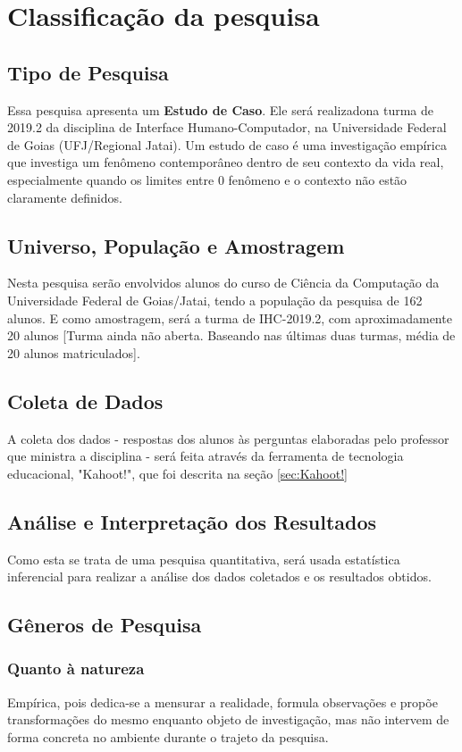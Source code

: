 \documentclass[
	12pt,				%
	openright,			%
	oneside,
	a4paper,			%
	english,			%
	french,				%
	spanish,			%
	brazil,				%
	]{abntex2}
\begin{document}
\section{Classificação da pesquisa}

\subsection{Tipo de Pesquisa}
Essa pesquisa apresenta um \textbf{Estudo de Caso}. Ele será realizadona turma de 2019.2 da disciplina de Interface Humano-Computador, na Universidade Federal de Goias (UFJ/Regional Jatai). Um estudo de caso é uma investigação empírica que investiga um fenômeno contemporâneo dentro de seu contexto da vida real, especialmente quando os limites entre 0 fenômeno e o contexto não estão claramente definidos. \cite{yin2001planejamento}

\subsection{Universo, População e Amostragem}
Nesta pesquisa serão envolvidos alunos do curso de Ciência da Computação da Universidade Federal de Goias/Jatai, tendo a população da pesquisa de 162 alunos. E como amostragem, será a turma de IHC-2019.2, com aproximadamente 20 alunos {\color{red}[Turma ainda não aberta. Baseando nas últimas duas turmas, média de 20 alunos matriculados]}.

\subsection{Coleta de Dados}
A coleta dos dados - respostas dos alunos às perguntas elaboradas pelo professor que ministra a disciplina - será feita através da ferramenta de tecnologia educacional, "Kahoot!", que foi descrita na seção \ref{sec:Kahoot!}

\subsection{Análise e Interpretação dos Resultados}
Como esta se trata de uma pesquisa quantitativa, será usada estatística inferencial para realizar a análise dos dados coletados e os resultados obtidos.

\subsection{Gêneros de Pesquisa}
\subsubsection{Quanto à natureza}
Empírica, pois dedica-se a mensurar a realidade, formula observações e propõe transformações do mesmo enquanto objeto de investigação, mas não intervem de forma concreta no ambiente durante o trajeto da pesquisa.
\end{document}
